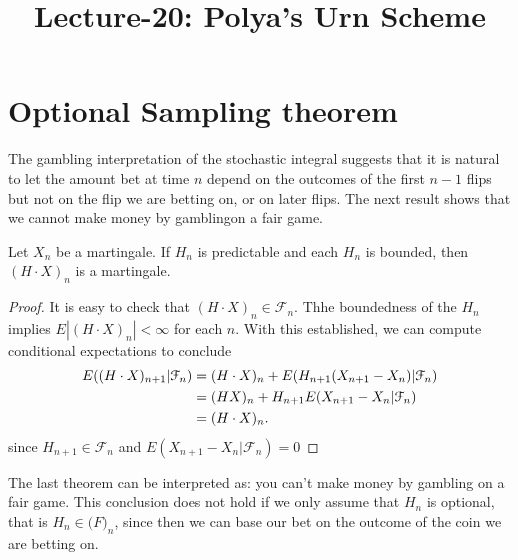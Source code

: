 \documentclass[a4paper,english,10pt]{article}
\title{Lecture-20: Polya's Urn Scheme}
\author{}
\begin{document}
\maketitle
\section{Optional Sampling theorem}
The gambling interpretation of the stochastic integral suggests that it is natural to let the amount bet at time $n$ depend on the outcomes of the first $n-1$ flips but not on the flip we are betting on, or on later flips. The next result shows that we cannot make money by gamblingon a fair game.

\begin{thm}Let $X_n$ be a martingale. If $H_n$ is predictable and each $H_n$ is bounded, then $(H\cdot X)_n$ is a martingale.
\end{thm}
\begin{proof} It is easy to check that $(H\cdot X)_n \in \mathcal{F}_n$. Thhe boundedness of the $H_n$ implies $E|(H\cdot X)_n|<\infty$ for each $n$. With this established, we can compute conditional expectations to conclude
\begin{align*}
E((H\cdot X)_{n+1}| \mathcal{F}_n)&=(H\cdot X)_n+E(H_{n+1}(X_{n+1}-X_n)| \mathcal{F}_n)\\
       &=(HX)_n+H_{n+1}E(X_{n+1}-X_n| \mathcal{F}_n)\\
       &=(H\cdot X)_n.\qedhere
\end{align*}
since $H_{n+1}\in \mathcal{F}_n$ and $E(X_{n+1}-X_n| \mathcal{F}_n)=0$
\end{proof}
The last theorem can be interpreted as: you can't make money by gambling on a fair game. This conclusion does not hold if we only assume that $H_n$ is optional, that is $H_n\in \mathcal(F)_n$, since then we can base our bet on the outcome of the coin we are betting on.
\end{document}
